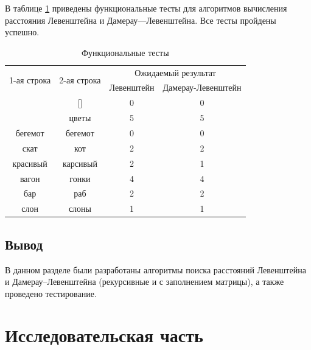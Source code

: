 \documentclass[a4paper,14pt, unknownkeysallowed]{extreport}
\begin{document}
В таблице \ref{tbl:functional_test} приведены функциональные тесты для алгоритмов вычисления расстояния Левенштейна и Дамерау—Левенштейна. Все тесты пройдены успешно.

\begin{table}[h]
	\begin{center}
	\begin{threeparttable}
		\captionsetup{justification=raggedright,singlelinecheck=off}
		\caption{\label{tbl:functional_test} Функциональные тесты}
		\begin{tabular}{|c|c|c|c|}
			\hline
			\multirow{2}{*}{1-ая строка} & \multirow{2}{*}{2-ая строка} & \multicolumn{2}{c|}{Ожидаемый результат} \\ \cline{3-4} 
			&  & Левенштейн & Дамерау-Левенштейн 
			\\ \hline
			[]	       & []       & 0    & 0               
			\\ \hline
			[]	       & цветы    & 5    & 5               
			\\ \hline
			бегемот    & бегемот  & 0    & 0                
			\\ \hline
			скат       & кот      & 2    & 2                
			\\ \hline
			красивый   & карсивый & 2    & 1                   
			\\ \hline
			вагон      & гонки    & 4    & 4                   
			\\ \hline
			бар        & раб      & 2    & 2                   
			\\ \hline
			слон       & слоны    & 1    & 1                   
			\\ \hline
		\end{tabular}
	\end{threeparttable}
	\end{center}
\end{table}


\section{Вывод}

В данном разделе были разработаны алгоритмы поиска расстояний Левенштейна и Дамерау–Левенштейна (рекурсивные и с заполнением матрицы), а также проведено тестирование.





\chapter{Исследовательская часть}
\end{document}

